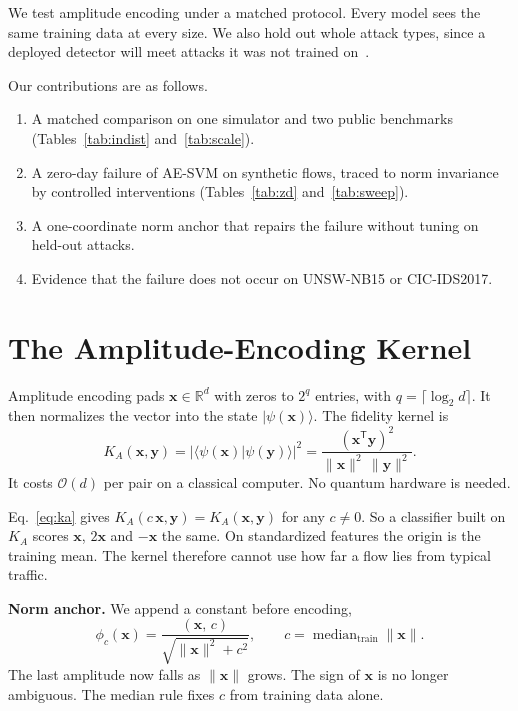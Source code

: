 \documentclass[conference,10pt]{IEEEtran}
\begin{document}
We test amplitude encoding under a matched protocol. Every model sees the same
training data at every size. We also hold out whole attack types, since a
deployed detector will meet attacks it was not trained on~\cite{sommer2010outside}.

Our contributions are as follows.
\begin{enumerate}
\item A matched comparison on one simulator and two public benchmarks
  (Tables~\ref{tab:indist} and~\ref{tab:scale}).
\item A zero-day failure of AE-SVM on synthetic flows, traced to norm invariance
  by controlled interventions (Tables~\ref{tab:zd} and~\ref{tab:sweep}).
\item A one-coordinate norm anchor that repairs the failure without tuning on
  held-out attacks.
\item Evidence that the failure does not occur on UNSW-NB15 or CIC-IDS2017.
\end{enumerate}

\section{The Amplitude-Encoding Kernel}
\label{sec:method}

Amplitude encoding pads $\mathbf{x}\in\mathbb{R}^d$ with zeros to $2^q$ entries,
with $q=\lceil\log_2 d\rceil$. It then normalizes the vector into the state
$|\psi(\mathbf{x})\rangle$. The fidelity kernel is
\begin{equation}
K_A(\mathbf{x},\mathbf{y}) = |\langle\psi(\mathbf{x})|\psi(\mathbf{y})\rangle|^2
= \frac{(\mathbf{x}^{\mathsf{T}}\mathbf{y})^2}{\|\mathbf{x}\|^2\,\|\mathbf{y}\|^2}.
\label{eq:ka}
\end{equation}
It costs $\mathcal{O}(d)$ per pair on a classical computer. No quantum hardware
is needed.

Eq.~\eqref{eq:ka} gives $K_A(c\,\mathbf{x},\mathbf{y})=K_A(\mathbf{x},\mathbf{y})$ for any
$c\neq0$. So a classifier built on $K_A$ scores $\mathbf{x}$, $2\mathbf{x}$ and
$-\mathbf{x}$ the same. On standardized features the origin is the training
mean. The kernel therefore cannot use how far a flow lies from typical traffic.

\textbf{Norm anchor.} We append a constant before encoding,
\begin{equation}
\phi_c(\mathbf{x}) = \frac{(\mathbf{x},\,c)}{\sqrt{\|\mathbf{x}\|^2+c^2}},
\qquad c = \operatorname{median}_{\mathrm{train}} \|\mathbf{x}\| .
\label{eq:anchor}
\end{equation}
The last amplitude now falls as $\|\mathbf{x}\|$ grows. The sign of $\mathbf{x}$ is
no longer ambiguous. The median rule fixes $c$ from training data alone.
\end{document}
